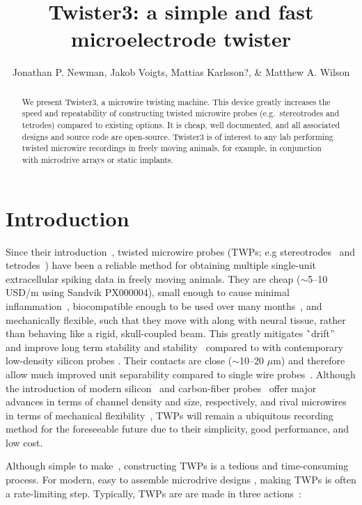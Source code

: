 \documentclass[11pt,a4paper]{article}
\title{Twister3: a simple and fast microelectrode twister}
\author{Jonathan P. Newman, Jakob Voigts, Mattias Karlsson?, \& Matthew A. Wilson}
\begin{document}
\maketitle

\begin{abstract}
    \noindent
    We present Twister3, a microwire twisting machine. This device greatly
    increases the speed and repeatability of constructing twisted microwire
    probes (e.g.\ stereotrodes and tetrodes) compared to existing options. It is
    cheap, well documented, and all associated designs and source code are
    open-source. Twister3 is of interest to any lab performing twisted
    microwire recordings in freely moving animals, for example, in conjunction
    with microdrive arrays or static implants.
\end{abstract}

\tableofcontents

\section{Introduction}
Since their introduction~\cite{}, twisted microwire probes (TWPs; e.g
stereotrodes~\cite{} and tetrodes~\cite{}) have been a reliable method for
obtaining multiple single-unit extracellular spiking data in freely moving
animals. They are cheap ($\sim$5--10 USD/m using Sandvik PX000004), small enough
to cause minimal inflammation~\cite{}, biocompatible enough to be used over
many months~\cite{}, and mechanically flexible, such that they move with along
with neural tissue, rather than behaving like a rigid, skull-coupled beam. This
greatly mitigates \``drift''~\cite{} and improve long term stability and
stability~\cite{} compared to with contemporary low-density silicon probes
\url{}. Their contacts are close ($\sim$10--20 $\mu$m) and therefore allow much improved
unit separability compared to single wire probes~\cite{}. Although the
introduction of modern silicon~\cite{} and carbon-fiber probes~\cite{} offer
major advances in terms of channel density and size, respectively, and rival
microwires in terms of mechanical flexibility~\cite{}, TWPs will remain a
ubiquitous recording method for the foreseeable future due to their simplicity,
good performance, and low cost.

Although simple to make~\cite{}, constructing TWPs is a tedious and
time-consuming process. For modern, easy to assemble microdrive designs
\cite{}, making TWPs is often a rate-limiting step. Typically, TWPs are are
made in three actions~\cite{}:
\end{document}
